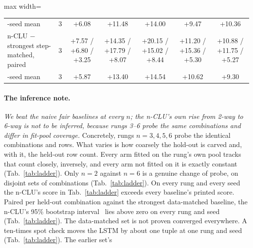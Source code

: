 \documentclass{article} %
\begin{document}
\begin{table}[t]
\begin{adjustbox}{max width=\linewidth}
\begin{tabular}{lcccccc}
\quad 3-seed mean & 3 & +6.08 & +11.48 & +14.00 & +9.47 & +10.36 \\
n-CLU $-$ strongest step-matched, paired & 3 & +7.57 / +6.80 / +3.25 & +14.35 / +17.79 / +8.07 & +20.15 / +15.02 / +8.44 & +11.20 / +15.36 / +5.30 & +10.88 / +11.75 / +5.27 \\
\quad 3-seed mean & 3 & +5.87 & +13.40 & +14.54 & +10.62 & +9.30 \\
\bottomrule
\end{tabular}\end{adjustbox}
\end{table}

\paragraph{The inference note.} \emph{We beat the naive fair baselines at
every $n$; the n-CLU's own rise from 2-way to 6-way is not to be inferred, because rungs 3--6
probe the same combinations and differ in fit-pool coverage.} Concretely,
rungs $n=3,4,5,6$ probe the identical combinations and rows. What varies is how
coarsely the hold-out is carved and, with it, the held-out row count. Every arm fitted on the rung's own pool tracks that count closely,
inversely, and every arm not fitted on it is exactly constant (Tab.~\ref{tab:ladder}).
Only $n=2$ against $n=6$ is a genuine change of probe, on disjoint sets of combinations
(Tab.~\ref{tab:ladder}). %
On every rung and every seed the n-CLU's score in Tab.~\ref{tab:ladder} exceeds every baseline's
printed score. Paired per held-out combination against the strongest data-matched baseline, the n-CLU's 95\% %
bootstrap interval~\citep{efron_bootstrap_1979} lies above zero on every rung and seed
(Tab.~\ref{tab:ladder}). %
The data-matched set is not proven converged everywhere. A ten-times spot check %
moves the LSTM by about one tuple at one rung and seed (Tab.~\ref{tab:ladder}). The earlier set's %
\end{document}

